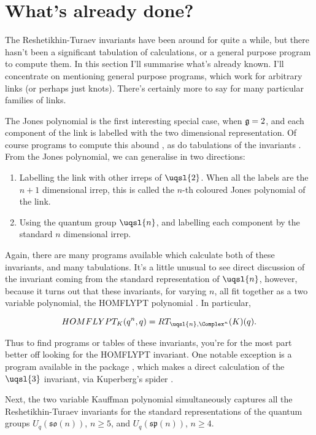 \section{What's already done?}
The Reshetikhin-Turaev invariants have been around for quite a while, but
there hasn't been a significant tabulation of calculations, or a general
purpose program to compute them. In this section I'll summarise what's
already known. I'll concentrate on mentioning general purpose programs,
which work for arbitrary links (or perhaps just knots). There's certainly
more to say for many particular families of links.

The Jones polynomial \cite{???} is the first interesting special case,
when $\mathfrak{g}=\sl{2}$, and each component of the link is labelled
with the two dimensional representation. Of course programs to compute
this abound \cite{???}, as do tabulations of the invariants \cite{???}.
From the Jones polynomial, we can generalise in two directions:
\begin{enumerate}
\item Labelling the link with other irreps of $\uqsl{2}$. When all the
labels are the $n+1$ dimensional irrep, this is called the $n$-th
coloured Jones polynomial of the link.
\item Using the quantum group $\uqsl{n}$, and labelling each component by
the standard $n$ dimensional irrep.
\end{enumerate}

Again, there are many programs available which calculate both of these
invariants, and many tabulations. It's a little unusual to see direct
discussion of the invariant coming from the standard representation of
$\uqsl{n}$, however, because it turns out that these invariants, for
varying $n$, all fit together as a two variable polynomial, the HOMFLYPT
polynomial \cite{???}. In particular,

$$HOMFLYPT_K(q^n, q) = RT_{\uqsl{n}, \Complex^n}(K)(q).$$

Thus to find programs or tables of these invariants, you're for the most
part better off looking for the HOMFLYPT invariant. One notable exception
is a program available in the  \MMA package \cite{???},
which makes a direct calculation of the $\uqsl{3}$ invariant, via
Kuperberg's spider \cite{???}.

Next, the two variable Kauffman polynomial simultaneously captures all
the Reshetikhin-Turaev invariants for the standard representations of the
quantum groups $U_q(\mathfrak{so}(n))$, $n \geq 5$, and
$U_q(\mathfrak{sp}(n))$, $n \geq 4$.


